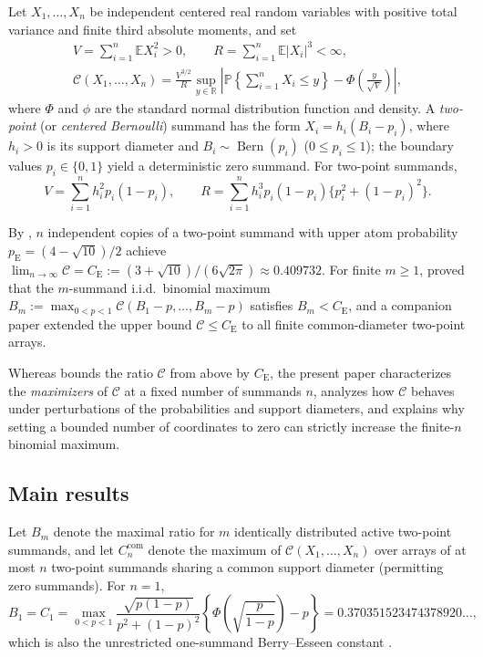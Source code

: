 \documentclass[11pt]{article}
\numberwithin{equation}{section}
\theoremstyle{remark}
\DeclareMathOperator{\Bern}{Bern}
\newcommand{\E}{\mathbb E}
\newcommand{\Pp}{\mathbb P}
\newcommand{\R}{\mathbb R}
\newcommand{\ce}{C_{\mathrm E}}
\newcommand{\pe}{p_{\mathrm E}}
\begin{document}
Let $X_1,\ldots,X_n$ be independent centered real random variables with
positive total variance and finite third absolute moments, and set
\begin{gather*}
 V=\sum_{i=1}^n\E X_i^2>0,\qquad R=\sum_{i=1}^n\E|X_i|^3<\infty,\\
 \mathcal C(X_1,\ldots,X_n)=\frac{V^{3/2}}R
   \sup_{y\in\R}\left|\Pp\left\{\sum_{i=1}^nX_i\le y\right\}-\Phi\!\left(\frac y{\sqrt V}\right)\right|,
\end{gather*}
where $\Phi$ and $\phi$ are the standard normal distribution function and
density. A \emph{two-point} (or \emph{centered Bernoulli}) summand has the
form $X_i=h_i(B_i-p_i)$, where $h_i>0$ is its support diameter and
$B_i\sim\Bern(p_i)$ ($0\le p_i\le1$); the boundary values $p_i\in\{0,1\}$
yield a deterministic zero summand. For two-point summands,
\begin{equation}\label{eq:binary-moments}
 V=\sum_{i=1}^n h_i^2p_i(1-p_i),\qquad
 R=\sum_{i=1}^n h_i^3p_i(1-p_i)\bigl\{p_i^2+(1-p_i)^2\bigr\}.
\end{equation}

By \citet[pp.~160--163]{Esseen1956}, $n$ independent copies of a two-point
summand with upper atom probability $\pe=(4-\sqrt{10})/2$ achieve
$\lim_{n\to\infty}\mathcal C=\ce:=(3+\sqrt{10})/(6\sqrt{2\pi})\approx0.409732$.
For finite $m\ge1$, \citet[Theorem~1]{Schulz2016} proved that the $m$-summand
i.i.d.\ binomial maximum $B_m:=\max_{0<p<1}\mathcal C(B_1-p,\ldots,B_m-p)$
satisfies $B_m<\ce$, and a companion paper \citep[Theorem~1.2(ii)]{BellFinite2026}
extended the upper bound $\mathcal C\le\ce$ to all finite common-diameter
two-point arrays.

Whereas \citet{BellFinite2026} bounds the ratio $\mathcal C$ from above by
$\ce$, the present paper characterizes the \emph{maximizers} of $\mathcal C$
at a fixed number of summands $n$, analyzes how $\mathcal C$ behaves under
perturbations of the probabilities and support diameters, and explains why
setting a bounded number of coordinates to zero can strictly increase the
finite-$n$ binomial maximum.

\subsection{Main results}

Let $B_m$ denote the maximal ratio for $m$ identically distributed active
two-point summands, and let $C_n^{\mathrm{com}}$ denote the maximum of
$\mathcal C(X_1,\ldots,X_n)$ over arrays of at most $n$ two-point summands
sharing a common support diameter (permitting zero summands). For $n=1$,
\begin{equation}\label{eq:c1}
 B_1=C_1=\max_{0<p<1}
 \frac{\sqrt{p(1-p)}}{p^2+(1-p)^2}
       \left\{\Phi\!\left(\sqrt{\frac p{1-p}}\right)-p\right\}
 =0.370351523474378920\ldots,
\end{equation}
which is also the unrestricted one-summand Berry--Esseen constant
\citep[Theorem~1]{BentkusKirsa1989}.
\end{document}
